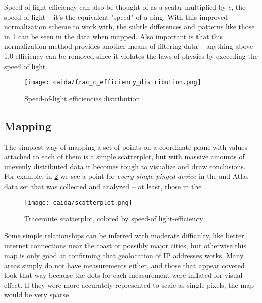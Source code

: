 Speed-of-light efficiency can also be thought of as a scalar multiplied by $c$, the speed of light -- it's the equivalent "speed" of a ping. With this improved normalization scheme to work with, the subtle differences and patterns like those in \cref{fig:speed_of_light_efficiency_distribution} can be seen in the data when mapped. Also important is that this normalization method provides another means of filtering data -- anything above 1.0 efficiency can be removed since it violates the laws of physics by exceeding the speed of light.

\begin{figure}[ht]
    \centering
    \texttt{[image: caida/frac\_c\_efficiency\_distribution.png]}
    \caption{Speed-of-light efficiencies distribution}
    \label{fig:speed_of_light_efficiency_distribution}
\end{figure}

\subsection{Mapping}

The simplest way of mapping a set of points on a coordinate plane with values attached to each of them is a simple scatterplot, but with massive amounts of unevenly distributed data it becomes tough to visualize and draw conclusions. For example, in \cref{fig:caida_scatterplot} we see a point for \textit{every single pinged device} in the \caida and \ripe Atlas data set that was collected and analyzed -- at least, those in the \us.

\begin{figure}[htb]
    \centering
    \texttt{[image: caida/scatterplot.png]}
    \caption{Traceroute scatterplot, colored by speed-of light-efficiency}
    \label{fig:caida_scatterplot}
\end{figure}

Some simple relationships can be inferred with moderate difficulty, like better internet connections near the coast or possibly major cities, but otherwise this map is only good at confirming that geolocation of IP addresses works. Many areas simply do not have measurements either, and those that appear covered look that way because the dots for each measurement were inflated for visual effect. If they were more accurately represented to-scale as single pixels, the map would be very sparse.

